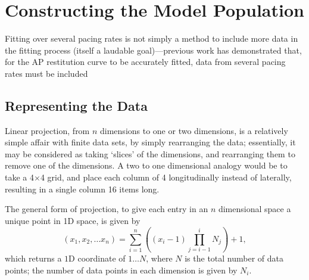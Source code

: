 \documentclass[../thesis-main.tex]{subfiles}
\begin{document}
 \section{Constructing the Model Population}
 \label{sec:methods}
 Fitting over several pacing rates is not simply a method to include more data in the fitting process (itself a laudable goal)---previous work has demonstrated that, for the AP restitution curve to be accurately fitted, data from several pacing rates must be included \citep{Syed2005}
 
 \subsection{Representing the Data}
 \label{subsec:cbdr}
 Linear projection, from $n$ dimensions to one or two dimensions, is a relatively simple affair with finite data sets, by simply rearranging the data; essentially, it may be considered as taking `slices' of the dimensions, and rearranging them to remove one of the dimensions. A two to one dimensional analogy would be to take a 4$\times$4 grid, and place each column of 4 longitudinally instead of laterally, resulting in a single column 16 items long.
 
 The general form of projection, to give each entry in an $n$ dimensional space a unique point in 1D space, is given by
 \begin{equation}
  (x_1, x_2, \ldots x_n) = \sum_{i=1}^n\left((x_i-1)\prod_{j=i-1}^i N_j\right) + 1,
  \label{eq:paramSpace-projection}
 \end{equation}
 which returns a $1$D coordinate of $1\ldots{}N$, where $N$ is the total number of data points; the number of data points in each dimension is given by $N_i$.
 
\end{document}
